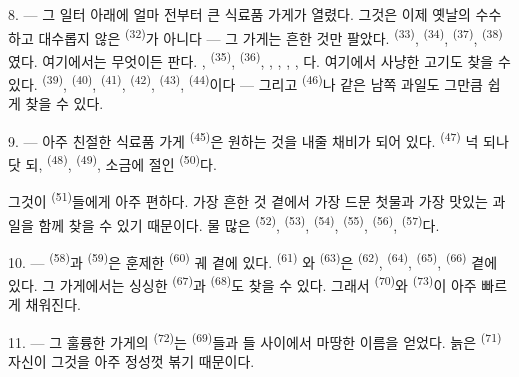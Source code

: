 8. --- 그 일터 아래에 얼마 전부터 큰 식료품 가게가 열렸다. 그것은 이제 옛날의 수수하고
대수롭지 않은  \textsuperscript{(32)}가 아니다 — 그 가게는 흔한 것만
팔았다.  \textsuperscript{(33)},  \textsuperscript{(34)},
 \textsuperscript{(37)},  \textsuperscript{(38)}였다.
여기에서는 무엇이든 판다. ,  \textsuperscript{(35)},
 \textsuperscript{(36)}, , , ,
, 다. 여기에서 사냥한 고기도 찾을 수 있다.
 \textsuperscript{(39)},  \textsuperscript{(40)},
 \textsuperscript{(41)},  \textsuperscript{(42)},
 \textsuperscript{(43)},  \textsuperscript{(44)}이다 — 그리고
 \textsuperscript{(46)}나  같은 남쪽 과일도 그만큼 쉽게
찾을 수 있다.

9. --- 아주 친절한 식료품 가게  \textsuperscript{(45)}은 원하는 것을 내줄
채비가 되어 있다.  \textsuperscript{(47)} 넉 되나 닷 되, 
\textsuperscript{(48)},  \textsuperscript{(49)}, 소금에 절인
 \textsuperscript{(50)}다.

그것이  \textsuperscript{(51)}들에게 아주 편하다. 가장 흔한 것 곁에서 가장
드문 첫물과 가장 맛있는 과일을 함께 찾을 수 있기 때문이다. 물 많은 
\textsuperscript{(52)},  \textsuperscript{(53)}, 
\textsuperscript{(54)},  \textsuperscript{(55)}, 
\textsuperscript{(56)},  \textsuperscript{(57)}다.

\VUsaut{4.0mm}
\VUsaut{3.0mm}

10. ---  \textsuperscript{(58)}과  \textsuperscript{(59)}은
훈제한  \textsuperscript{(60)} 궤 곁에 있다.  \textsuperscript{(61)}
와  \textsuperscript{(63)}은  \textsuperscript{(62)},
 \textsuperscript{(64)},  \textsuperscript{(65)},
 \textsuperscript{(66)} 곁에 있다. 그 가게에서는 싱싱한 
\textsuperscript{(67)}과  \textsuperscript{(68)}도 찾을 수 있다. 그래서
 \textsuperscript{(70)}와  \textsuperscript{(73)}이 아주
빠르게 채워진다.

11. --- 그 훌륭한 가게의  \textsuperscript{(72)}는 
\textsuperscript{(69)}들과 들 사이에서 마땅한 이름을 얻었다. 늙은
 \textsuperscript{(71)} 자신이 그것을 아주 정성껏 볶기 때문이다.

